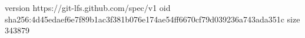 version https://git-lfs.github.com/spec/v1
oid sha256:4d45edaef6e7f89b1ac3f381b076e174ae54ff6670cf79d039236a743ada351c
size 343879
